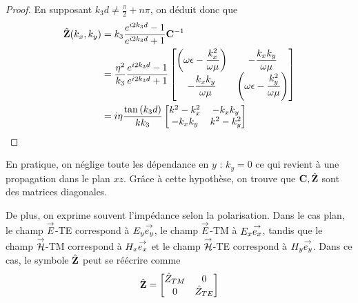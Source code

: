 \begin{proof}
            En supposant \(k_3d \not = \frac{\pi}{2} + n\pi\), on déduit donc que
            \begin{align}
                \hat {\mathbf{Z}}(k_x,k_y) &=  k_3 \dfrac{e^{i2k_3d} -1}{e^{i2k_3d} +1} \mathbf{C}^{-1}
                \\
                &= \dfrac{\eta^2}{k_3} \dfrac{e^{i2k_3d} -1}{e^{i2k_3d} +1}
                    \begin{bmatrix}
                       \left(\omega\epsilon-\dfrac{k_x^2}{\omega\mu}\right)  & -\dfrac{k_xk_y}{\omega\mu}\\
                        -\dfrac{k_xk_y}{\omega\mu} &  \left(\omega\epsilon-\dfrac{k_y^2}{\omega\mu}\right)
                    \end{bmatrix}
                \\
                &= i\eta\dfrac{\tan\left(k_3d\right)}{kk_3}
                    \begin{bmatrix}
                       k^2-k_x^2  & -k_xk_y\\
                        -k_xk_y & k^2-k_y^2\\
                    \end{bmatrix}
            \end{align}

        \end{proof}

        En pratique, on néglige toute les dépendance en \(y\) : \(k_y = 0\) ce qui revient à une propagation dans le plan \(xz\). Grâce à cette hypothèse, on trouve que \(\mathbf{C}, \hat {\mathbf{Z}}\) sont des matrices diagonales.

        De plus, on exprime souvent l'impédance selon la polarisation.
        Dans le cas plan, le champ \({\overset{\rightarrow}{E}}\)-TE correspond à \({E_y} {\overset{\rightarrow}{e_y}}\), le champ \({\overset{\rightarrow}{E}}\)-TM à \({E_x} {\overset{\rightarrow}{e_x}}\), tandis que le champ \({\overset{\rightarrow}{\mathcal{H}}}\)-TM correspond à \({H_x} {\overset{\rightarrow}{e_x}}\) et le champ \({\overset{\rightarrow}{\mathcal{H}}}\)-TE correspond à \({H_y} {\overset{\rightarrow}{e_y}}\).
        Dans ce cas, le symbole \(\hat {\mathbf{Z}}\) peut se réécrire comme
        \begin{equation}
            \hat {\mathbf{Z}} =
            \begin{bmatrix}
                \hat Z_{TM} & 0
                \\
                0 & \hat Z_{TE}
            \end{bmatrix}
        \end{equation}

